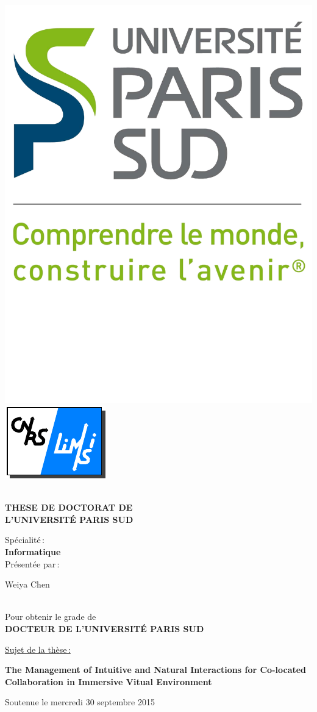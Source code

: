 \begin{titlepage}

\includegraphics[height=2.cm]{./logos/Logo_UPS.pdf}\hfill
\includegraphics[height=2.cm]{./logos/logo-limsi.pdf}\hfill
\\
\\

\begin{center}
  \begin{Large}
    \textbf{THESE DE DOCTORAT DE\\ L'UNIVERSIT\'E PARIS SUD\\}
  \end{Large}
  Sp\'ecialit\'e\,:\\
  \textbf{Informatique}\\ 
  Pr\'esent\'ee par\,:\\ 
  \begin{LARGE}
    Weiya Chen\end{LARGE}\\
  Pour obtenir le grade de\\
  \textbf{DOCTEUR DE L'UNIVERSIT\'E PARIS SUD}
\end{center}

\noindent \underline{Sujet de la thèse\,:}\\
\begin{center}
  \begin{Large}
    {\textbf{The Management of Intuitive and Natural Interactions for Co-located Collaboration in Immersive Vitual Environment}}
  \end{Large}
\end{center}

Soutenue le mercredi 30 septembre 2015\\


\end{titlepage}
